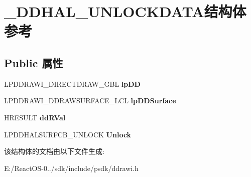 \hypertarget{struct___d_d_h_a_l___u_n_l_o_c_k_d_a_t_a}{}\section{\+\_\+\+D\+D\+H\+A\+L\+\_\+\+U\+N\+L\+O\+C\+K\+D\+A\+T\+A结构体 参考}
\label{struct___d_d_h_a_l___u_n_l_o_c_k_d_a_t_a}
\subsection*{Public 属性}
\begin{DoxyCompactItemize}
\item 
\mbox{\label{struct___d_d_h_a_l___u_n_l_o_c_k_d_a_t_a_a98240c2f3310390a4d877e8ff6d2d4ba}} 
L\+P\+D\+D\+R\+A\+W\+I\+\_\+\+D\+I\+R\+E\+C\+T\+D\+R\+A\+W\+\_\+\+G\+BL {\bfseries lp\+DD}
\item 
\mbox{\label{struct___d_d_h_a_l___u_n_l_o_c_k_d_a_t_a_a28bca39b8c05633bd0d96b2bbac6dfe8}} 
L\+P\+D\+D\+R\+A\+W\+I\+\_\+\+D\+D\+R\+A\+W\+S\+U\+R\+F\+A\+C\+E\+\_\+\+L\+CL {\bfseries lp\+D\+D\+Surface}
\item 
\mbox{\label{struct___d_d_h_a_l___u_n_l_o_c_k_d_a_t_a_a4ce00881cb75a6b1f553a756446ee2ab}} 
H\+R\+E\+S\+U\+LT {\bfseries dd\+R\+Val}
\item 
\mbox{\label{struct___d_d_h_a_l___u_n_l_o_c_k_d_a_t_a_a33a7d64ef8a5a1d15ccdc5db66a29615}} 
L\+P\+D\+D\+H\+A\+L\+S\+U\+R\+F\+C\+B\+\_\+\+U\+N\+L\+O\+CK {\bfseries Unlock}
\end{DoxyCompactItemize}


该结构体的文档由以下文件生成\+:\begin{DoxyCompactItemize}
\item 
E\+:/\+React\+O\+S-\/0../sdk/include/psdk/ddrawi.\+h\end{DoxyCompactItemize}
